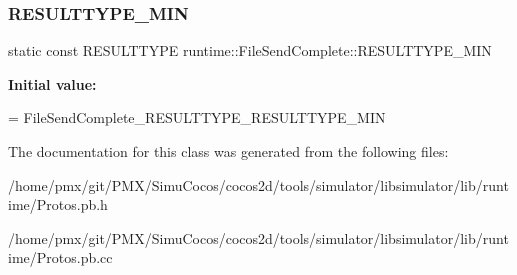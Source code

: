 \subsubsection{\texorpdfstring{R\+E\+S\+U\+L\+T\+T\+Y\+P\+E\+\_\+\+M\+IN}{RESULTTYPE\_MIN}}
{\footnotesize\ttfamily static const R\+E\+S\+U\+L\+T\+T\+Y\+PE runtime\+::\+File\+Send\+Complete\+::\+R\+E\+S\+U\+L\+T\+T\+Y\+P\+E\+\_\+\+M\+IN\hspace{0.3cm}{\ttfamily [static]}}

{\bfseries Initial value\+:}
\begin{DoxyCode}
=
    FileSendComplete\_RESULTTYPE\_RESULTTYPE\_MIN
\end{DoxyCode}


The documentation for this class was generated from the following files\+:\begin{DoxyCompactItemize}
\item 
/home/pmx/git/\+P\+M\+X/\+Simu\+Cocos/cocos2d/tools/simulator/libsimulator/lib/runtime/Protos.\+pb.\+h\item 
/home/pmx/git/\+P\+M\+X/\+Simu\+Cocos/cocos2d/tools/simulator/libsimulator/lib/runtime/Protos.\+pb.\+cc\end{DoxyCompactItemize}
